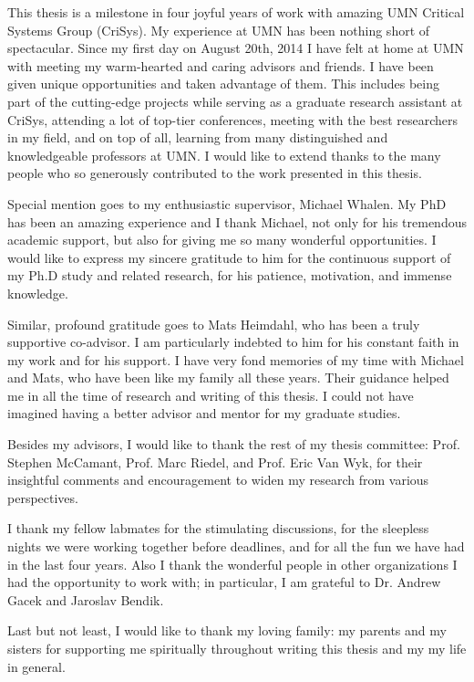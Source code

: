 This thesis is a milestone in four joyful years of work with amazing UMN Critical Systems Group (CriSys). My experience at UMN has been nothing short of spectacular. Since my first day on August 20th, 2014 I have felt at home at UMN with meeting my warm-hearted and caring advisors and friends. I have been given unique opportunities and taken
advantage of them. This includes being part of the cutting-edge projects while serving as a graduate research assistant at CriSys, attending a lot of top-tier conferences, meeting with the best researchers in my field, and on top of all, learning from many distinguished and knowledgeable professors at UMN. I would like to extend thanks to the many people who so generously contributed to the work presented in this thesis.

Special mention goes to my enthusiastic supervisor, Michael Whalen. My PhD has been an amazing experience and I thank Michael, not only for his tremendous academic support, but also for giving me so many wonderful opportunities. I would like to express my sincere gratitude to him for the continuous support of my Ph.D study and related research, for his patience, motivation, and immense knowledge.

Similar, profound gratitude goes to Mats Heimdahl, who has been a truly supportive co-advisor. I am particularly indebted to him for his constant faith in my work and for his support. I have very fond memories of my time with Michael and Mats, who have been like my family all these years. Their guidance helped me in all the time of research and writing of this thesis. I could not have imagined having a better advisor and mentor for my graduate studies.

Besides my advisors, I would like to thank the rest of my thesis committee: Prof. Stephen McCamant, Prof. Marc Riedel, and Prof. Eric Van Wyk, for their insightful comments and encouragement to widen my research from various perspectives.

I thank my fellow labmates for the stimulating discussions, for the sleepless nights we were working together before deadlines, and for all the fun we have had in the last four years. Also I thank the wonderful people in other organizations I had the opportunity to work with; in particular, I am grateful to Dr. Andrew Gacek and Jaroslav Bendik.

Last but not least, I would like to thank my loving family: my parents and my sisters for supporting me spiritually throughout writing this thesis and my my life in general. 